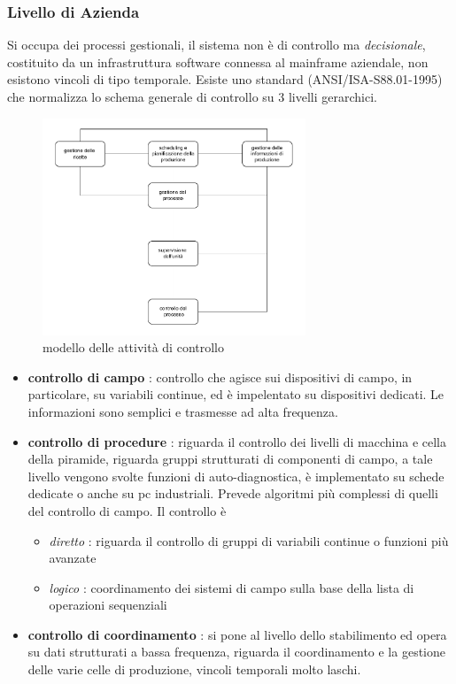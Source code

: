 \documentclass[10pt, letterpaper]{report}
\begin{document}
\subsubsection{Livello di Azienda}
Si occupa dei processi gestionali, il sistema non è di controllo ma \textit{decisionale}, costituito da un 
infrastruttura software connessa al mainframe aziendale, non esistono vincoli di tipo temporale.\acc 
Esiste uno standard (ANSI/ISA-S88.01-1995) che normalizza lo schema generale di controllo su 3 livelli gerarchici.
\begin{figure}[h!]
    \centering
    \includegraphics[width=0.7\textwidth ]{images/standardControlModel.pdf}
    \caption{modello delle attività di controllo}
\end{figure}
\begin{itemize}
    \item \textbf{controllo di campo} : controllo che agisce sui dispositivi di campo, in particolare, 
    su variabili continue, ed è impelentato su dispositivi dedicati. Le informazioni sono semplici 
    e trasmesse ad alta frequenza. 
    \item \textbf{controllo di procedure} : riguarda il controllo dei livelli di macchina e cella della 
    piramide, riguarda gruppi strutturati di componenti di campo, a tale livello vengono svolte funzioni di 
    auto-diagnostica, è implementato su schede dedicate o anche su pc industriali. Prevede 
    algoritmi più complessi di quelli del controllo di campo. Il controllo è \begin{itemize}
        \item \textit{diretto} : riguarda il controllo di 
        gruppi di variabili continue o funzioni più avanzate 
        \item \textit{logico} : coordinamento dei sistemi di campo sulla base della lista 
        di operazioni sequenziali
    \end{itemize}
    \item \textbf{controllo di coordinamento} : si pone al livello dello stabilimento ed opera su dati 
    strutturati a bassa frequenza, riguarda il coordinamento e la gestione delle varie celle di produzione, vincoli 
    temporali molto laschi.
\end{itemize}
\end{document}
